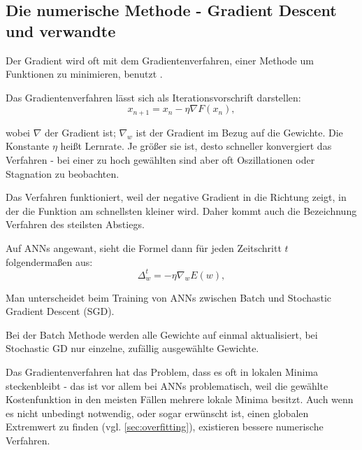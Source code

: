 \subsection{Die numerische Methode - Gradient Descent und verwandte}

Der Gradient wird oft mit dem Gradientenverfahren, einer Methode um Funktionen zu minimieren, benutzt \cite{bishop1995neural,bengio2012practical}.

Das Gradientenverfahren lässt sich als Iterationsvorschrift darstellen:
\begin{equation}
x_{n+1}=x_n- \eta  \nabla F(x_n), 
\end{equation}

wobei $\nabla$ der Gradient ist; $\nabla_w$ ist der Gradient im Bezug auf die Gewichte. 
Die Konstante $\eta$ heißt Lernrate. Je größer sie ist, desto schneller konvergiert das Verfahren - bei einer zu hoch gewählten sind aber oft Oszillationen oder Stagnation zu beobachten. 

Das Verfahren funktioniert, weil der negative Gradient in die Richtung zeigt, in der die Funktion am schnellsten kleiner wird. Daher kommt auch die Bezeichnung Verfahren des steilsten Abstiegs.

Auf ANNs angewant, sieht die Formel dann für jeden Zeitschritt $t$ folgendermaßen aus:
\begin{equation}
  \Delta_w^t = - \eta  \nabla_w E(w),
\end{equation}




Man unterscheidet beim Training von ANNs zwischen Batch und Stochastic Gradient Descent (SGD).

Bei der Batch Methode werden alle Gewichte auf einmal aktualisiert, bei Stochastic GD nur einzelne, zufällig ausgewählte Gewichte.

Das Gradientenverfahren hat das Problem, dass es oft in lokalen Minima steckenbleibt - das ist vor allem bei ANNs problematisch, weil die gewählte Kostenfunktion in den meisten Fällen mehrere lokale Minima besitzt. Auch wenn es nicht unbedingt notwendig, oder sogar erwünscht ist, einen globalen Extremwert zu finden (vgl. \ref{sec:overfitting}), existieren bessere numerische Verfahren. 

